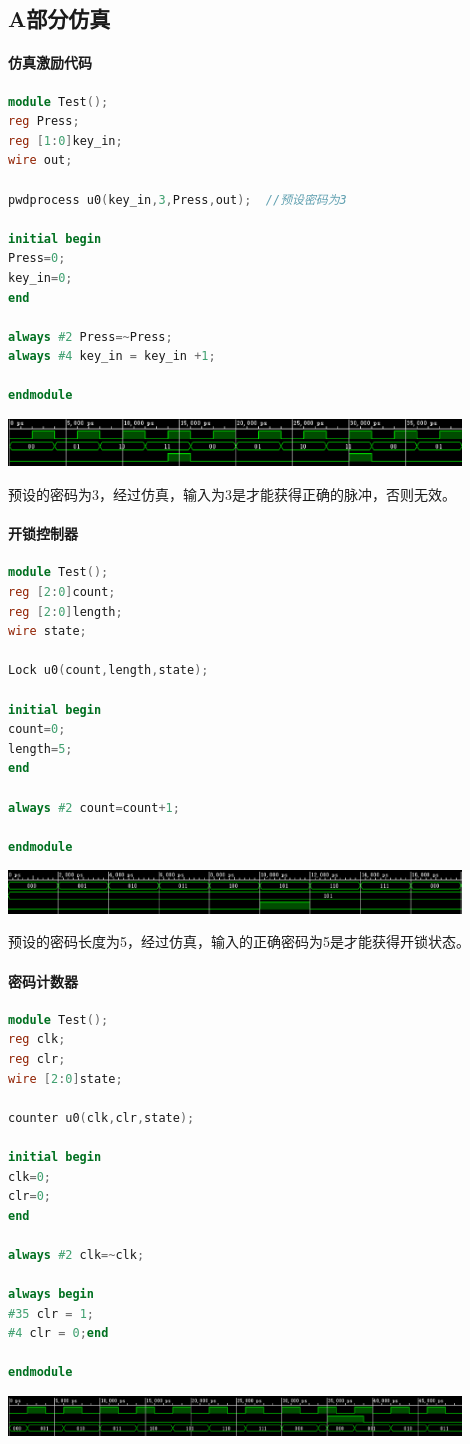 \documentclass[a4paper,11pt]{ctexart}
\begin{document}
\subsection{A部分仿真}
\paragraph{仿真激励代码}
\begin{lstlisting}[language={verilog}]
module Test();
reg Press;
reg [1:0]key_in;
wire out;

pwdprocess u0(key_in,3,Press,out);  //预设密码为3

initial begin
Press=0;
key_in=0;
end

always #2 Press=~Press;
always #4 key_in = key_in +1;

endmodule
\end{lstlisting}
\includegraphics[width=0.9\textwidth]{./images/sim1.eps}

预设的密码为3，经过仿真，输入为3是才能获得正确的脉冲，否则无效。
\paragraph{开锁控制器}
\begin{lstlisting}[language={verilog}]
module Test();
reg [2:0]count;
reg [2:0]length;
wire state;

Lock u0(count,length,state);

initial begin
count=0;
length=5;
end

always #2 count=count+1;

endmodule
\end{lstlisting}
\includegraphics[width=0.9\textwidth]{./images/sim2.eps}

预设的密码长度为5，经过仿真，输入的正确密码为5是才能获得开锁状态。

\paragraph{密码计数器}
\begin{lstlisting}[language={verilog}]
module Test();
reg clk;
reg clr;
wire [2:0]state;

counter u0(clk,clr,state);

initial begin
clk=0;
clr=0;
end

always #2 clk=~clk;

always begin
#35 clr = 1;
#4 clr = 0;end

endmodule
\end{lstlisting}
\includegraphics[width=0.9\textwidth]{./images/sim3.eps}
\end{document}
